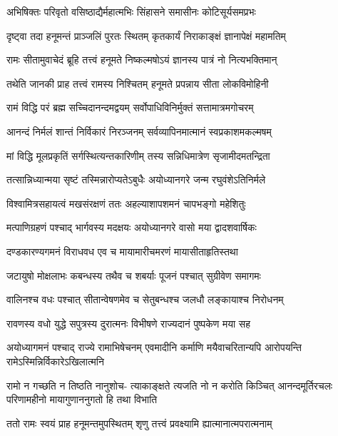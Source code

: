 \twolineshloka
{अभिषिक्तः परिवृतो वसिष्ठाद्यैर्महात्मभिः}
{सिंहासने समासीनः कोटिसूर्यसमप्रभः} %

\twolineshloka
{दृष्ट्वा तदा हनूमन्तं प्राञ्जलिं पुरतः स्थितम्}
{कृतकार्यं निराकाङ्क्षं ज्ञानापेक्षं महामतिम्} %

\twolineshloka
{रामः सीतामुवाचेदं ब्रूहि तत्त्वं हनूमते}
{निष्कल्मषोऽयं ज्ञानस्य पात्रं नो नित्यभक्तिमान्} %

\twolineshloka
{तथेति जानकी प्राह तत्त्वं रामस्य निश्चितम्}
{हनूमते प्रपन्नाय सीता लोकविमोहिनी} %


\twolineshloka
{रामं विद्धि परं ब्रह्म सच्चिदानन्दमद्वयम्}
{सर्वोपाधिविनिर्मुक्तं सत्तामात्रमगोचरम्} %

\twolineshloka
{आनन्दं निर्मलं शान्तं निर्विकारं निरञ्जनम्}
{सर्वव्यापिनमात्मानं स्वप्रकाशमकल्मषम्} %

\twolineshloka
{मां विद्धि मूलप्रकृतिं सर्गस्थित्यन्तकारिणीम्}
{तस्य सन्निधिमात्रेण सृजामीदमतन्द्रिता} %

\twolineshloka
{तत्सान्निध्यान्मया सृष्टं तस्मिन्नारोप्यतेऽबुधैः}
{अयोध्यानगरे जन्म रघुवंशेऽतिनिर्मले} %

\twolineshloka
{विश्वामित्रसहायत्वं मखसंरक्षणं ततः}
{अहल्याशापशमनं चापभङ्गो महेशितुः} %

\twolineshloka
{मत्पाणिग्रहणं पश्चाद् भार्गवस्य मदक्षयः}
{अयोध्यानगरे वासो मया द्वादशवार्षिकः} %

\twolineshloka
{दण्डकारण्यगमनं विराधवध एव च}
{मायामारीचमरणं मायासीताहृतिस्तथा} %

\twolineshloka
{जटायुषो मोक्षलाभः कबन्धस्य तथैव च}
{शबर्याः पूजनं पश्चात् सुग्रीवेण समागमः} %

\twolineshloka
{वालिनश्च वधः पश्चात् सीतान्वेषणमेव च}
{सेतुबन्धश्च जलधौ लङ्कायाश्च निरोधनम्} %

\twolineshloka
{रावणस्य वधो युद्धे सपुत्रस्य दुरात्मनः}
{विभीषणे राज्यदानं पुष्पकेण मया सह} %

\threelineshloka
{अयोध्यागमनं पश्चाद् राज्ये रामाभिषेचनम्}
{एवमादीनि कर्माणि मयैवाचरितान्यपि}
{आरोपयन्ति रामेऽस्मिन्निर्विकारेऽखिलात्मनि} %

\fourlineindentedshloka
{रामो न गच्छति न तिष्ठति नानुशोच-}
{त्याकाङ्क्षते त्यजति नो न करोति किञ्चित्}
{आनन्दमूर्तिरचलः परिणामहीनो}
{मायागुणाननुगतो हि तथा विभाति} %


\twolineshloka
{ततो रामः स्वयं प्राह हनूमन्तमुपस्थितम्}
{शृणु तत्त्वं प्रवक्ष्यामि ह्यात्मानात्मपरात्मनाम्} %

